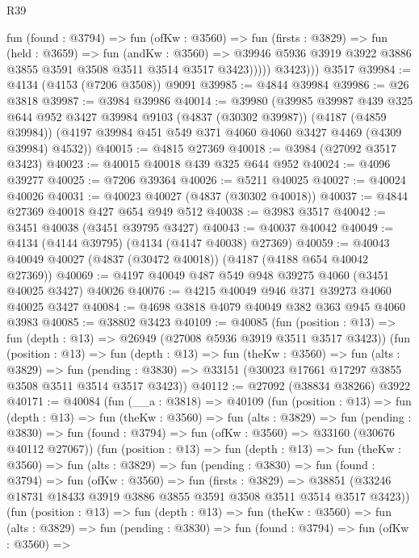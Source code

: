 \begin{lexlean}{R39}
\begin{coremodule}
                fun (found : @3794) =>
                fun (ofKw : @3560) =>
                fun (firsts : @3829) =>
                fun (held : @3659) =>
                fun (andKw : @3560) =>
                @39946 @5936 @3919 @3922 @3886 @3855 @3591 @3508 @3511 @3514 @3517 @3423)))))
          @3423)))
    @3517
@39984 := @4134 (@4153 (@7206 @3508)) @9091
@39985 := @4844 @39984
@39986 := @26 @3818
@39987 := @3984 @39986
@40014 := @39980
    (@39985
      @39987
      @439
      @325
      @644
      @952
      @3427
      @39984
      @9103
      (@4837 (@30302 @39987))
      (@4187 (@4859 @39984))
      (@4197 @39984 @451 @549 @371 @4060 @4060 @3427 @4469 (@4309 @39984) @4532))
@40015 := @4815 @27369
@40018 := @3984 (@27092 @3517 @3423)
@40023 := @40015 @40018 @439 @325 @644 @952
@40024 := @4096 @39277
@40025 := @7206 @39364
@40026 := @5211 @40025
@40027 := @40024 @40026
@40031 := @40023 @40027 (@4837 (@30302 @40018))
@40037 := @4844 @27369 @40018 @427 @654 @949 @512
@40038 := @3983 @3517
@40042 := @3451 @40038 (@3451 @39795 @3427)
@40043 := @40037 @40042
@40049 := @4134 (@4144 @39795) (@4134 (@4147 @40038) @27369)
@40059 := @40043 @40049 @40027 (@4837 (@30472 @40018)) (@4187 (@4188 @654 @40042 @27369))
@40069 := @4197 @40049 @487 @549 @948 @39275 @4060 (@3451 @40025 @3427) @40026
@40076 := @4215 @40049 @946 @371 @39273 @4060 @40025 @3427
@40084 := @4698 @3818 @4079 @40049 @382 @363 @945 @4060 @3983
@40085 := @38802 @3423
@40109 := @40085
    (fun (position : @13) => fun (depth : @13) => @26949 (@27008 @5936 @3919 @3511 @3517 @3423))
    (fun (position : @13) =>
    fun (depth : @13) =>
    fun (theKw : @3560) =>
    fun (alts : @3829) =>
    fun (pending : @3830) => @33151 (@30023 @17661 @17297 @3855 @3508 @3511 @3514 @3517 @3423))
@40112 := @27092 (@38834 @38266) @3922
@40171 := @40084
    (fun (__a : @3818) =>
    @40109
      (fun (position : @13) =>
      fun (depth : @13) =>
      fun (theKw : @3560) =>
      fun (alts : @3829) =>
      fun (pending : @3830) =>
      fun (found : @3794) => fun (ofKw : @3560) => @33160 (@30676 @40112 @27067))
      (fun (position : @13) =>
      fun (depth : @13) =>
      fun (theKw : @3560) =>
      fun (alts : @3829) =>
      fun (pending : @3830) =>
      fun (found : @3794) =>
      fun (ofKw : @3560) =>
      fun (firsts : @3829) =>
      @38851 (@33246 @18731 @18433 @3919 @3886 @3855 @3591 @3508 @3511 @3514 @3517 @3423))
      (fun (position : @13) =>
      fun (depth : @13) =>
      fun (theKw : @3560) =>
      fun (alts : @3829) =>
      fun (pending : @3830) =>
      fun (found : @3794) =>
      fun (ofKw : @3560) =>

\end{coremodule}
\end{lexlean}
